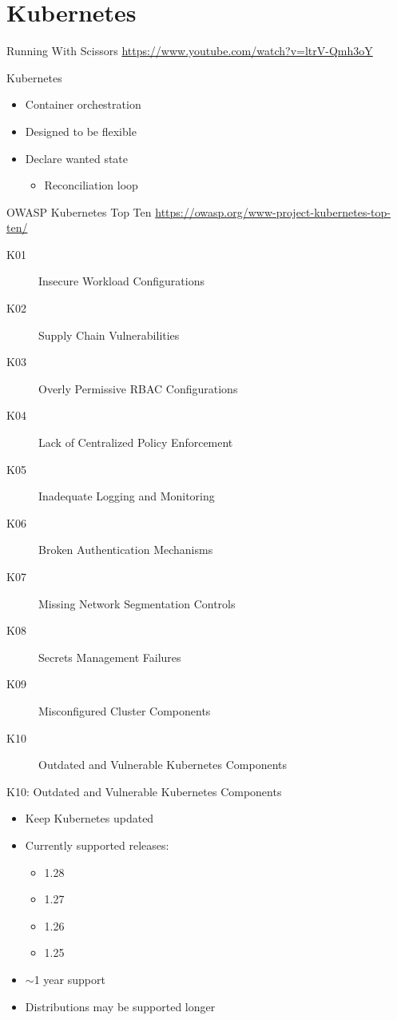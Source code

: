 \documentclass{dcpresentation}
\begin{document}
\section{Kubernetes}


\begin{frame}{Running With Scissors}
  \url{https://www.youtube.com/watch?v=ltrV-Qmh3oY}
\end{frame}


\begin{frame}{Kubernetes}
  \begin{itemize}
  \item Container orchestration
  \item Designed to be flexible
  \item Declare wanted state
    \begin{itemize}
    \item Reconciliation loop
    \end{itemize}
  \end{itemize}
\end{frame}


\begin{frame}{OWASP Kubernetes Top Ten}
  {\url{https://owasp.org/www-project-kubernetes-top-ten/}}
  \begin{description}
  \item[K01] Insecure Workload Configurations
  \item[K02] Supply Chain Vulnerabilities
  \item[K03] Overly Permissive RBAC Configurations
  \item[K04] Lack of Centralized Policy Enforcement
  \item[K05] Inadequate Logging and Monitoring
  \item[K06] Broken Authentication Mechanisms
  \item[K07] Missing Network Segmentation Controls
  \item[K08] Secrets Management Failures
  \item[K09] Misconfigured Cluster Components
  \item[K10] Outdated and Vulnerable Kubernetes Components
  \end{description}
\end{frame}


\begin{frame}{K10: Outdated and Vulnerable Kubernetes Components}
  \begin{itemize}
  \item Keep Kubernetes updated
  \item Currently supported releases:
    \begin{itemize}
    \item 1.28
    \item 1.27
    \item 1.26
    \item 1.25
    \end{itemize}
  \item $\sim$1 year support
  \item Distributions may be supported longer
  \end{itemize}
\end{frame}
\end{document}

